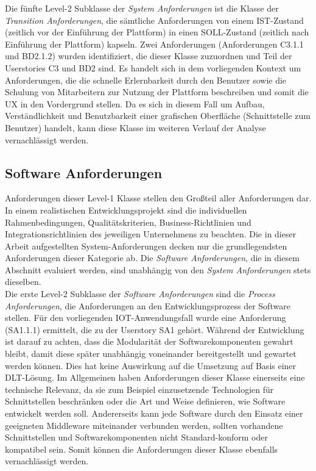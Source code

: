 Die fünfte Level-2 Subklasse der \textit{System Anforderungen} ist die Klasse der \textit{Transition Anforderungen}, die sämtliche Anforderungen von einem IST-Zustand (zeitlich vor der Einführung der Plattform) in einen SOLL-Zustand (zeitlich nach Einführung der Plattform) kapseln. Zwei Anforderungen (Anforderungen C3.1.1 und BD2.1.2) wurden identifiziert, die dieser Klasse zuzuordnen und Teil der Userstories C3 und BD2 sind. Es handelt sich in dem vorliegenden Kontext um Anforderungen, die die schnelle Erlernbarkeit durch den Benutzer sowie die Schulung von Mitarbeitern zur Nutzung der Plattform beschreiben und somit die \ac{UX} in den Vordergrund stellen. Da es sich in diesem Fall um Aufbau, Verständlichkeit und Benutzbarkeit einer grafischen Oberfläche (Schnittstelle zum Benutzer) handelt, kann diese Klasse im weiteren Verlauf der Analyse vernachlässigt werden.\\

\subsection{Software Anforderungen}
\label{subsec:requirements:evaluation:software}
Anforderungen dieser Level-1 Klasse stellen den Großteil aller Anforderungen dar. In einem realistischen Entwicklungsprojekt sind die individuellen Rahmenbedingungen, Qualitätskriterien, Business-Richtlinien und Integrationsrichtlinien des jeweiligen Unternehmens zu beachten. Die in dieser Arbeit aufgestellten System-Anforderungen decken nur die grundlegendsten Anforderungen dieser Kategorie ab. Die \textit{Software Anforderungen}, die in diesem Abschnitt evaluiert werden, sind unabhängig von den \textit{System Anforderungen} stets dieselben.\\

Die erste Level-2 Subklasse der \textit{Software Anforderungen} sind die \textit{Process Anforderungen}, die Anforderungen an den Entwicklungsprozess der Software stellen. Für den vorliegenden IOT-Anwendungsfall wurde eine Anforderung (SA1.1.1) ermittelt, die zu der Userstory SA1 gehört. Während der Entwicklung ist darauf zu achten, dass die Modularität der Softwarekomponenten gewahrt bleibt, damit diese später unabhängig voneinander bereitgestellt und gewartet werden können. Dies hat keine Auswirkung auf die Umsetzung auf Basis einer \ac{DLT}-Lösung. Im Allgemeinen haben Anforderungen dieser Klasse einerseits eine technische Relevanz, da sie zum Beispiel einzusetzende Technologien für Schnittstellen beschränken oder die Art und Weise definieren, wie Software entwickelt werden soll. Andererseits kann jede Software durch den Einsatz einer geeigneten Middleware miteinander verbunden werden, sollten vorhandene Schnittstellen und Softwarekomponenten nicht Standard-konform oder kompatibel sein. Somit können die Anforderungen dieser Klasse ebenfalls vernachlässigt werden.\\

